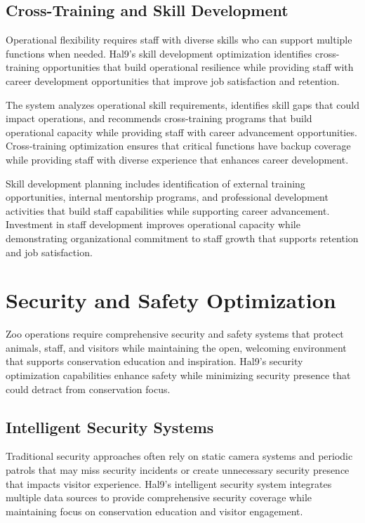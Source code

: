 \documentclass[
  Letterpaper,
]{scrbook}
\begin{document}
\subsection{Cross-Training and Skill
Development}\label{cross-training-and-skill-development}

Operational flexibility requires staff with diverse skills who can
support multiple functions when needed. Hal9's skill development
optimization identifies cross-training opportunities that build
operational resilience while providing staff with career development
opportunities that improve job satisfaction and retention.

The system analyzes operational skill requirements, identifies skill
gaps that could impact operations, and recommends cross-training
programs that build operational capacity while providing staff with
career advancement opportunities. Cross-training optimization ensures
that critical functions have backup coverage while providing staff with
diverse experience that enhances career development.

Skill development planning includes identification of external training
opportunities, internal mentorship programs, and professional
development activities that build staff capabilities while supporting
career advancement. Investment in staff development improves operational
capacity while demonstrating organizational commitment to staff growth
that supports retention and job satisfaction.

\section{Security and Safety
Optimization}\label{security-and-safety-optimization}

Zoo operations require comprehensive security and safety systems that
protect animals, staff, and visitors while maintaining the open,
welcoming environment that supports conservation education and
inspiration. Hal9's security optimization capabilities enhance safety
while minimizing security presence that could detract from conservation
focus.

\subsection{Intelligent Security
Systems}\label{intelligent-security-systems}

Traditional security approaches often rely on static camera systems and
periodic patrols that may miss security incidents or create unnecessary
security presence that impacts visitor experience. Hal9's intelligent
security system integrates multiple data sources to provide
comprehensive security coverage while maintaining focus on conservation
education and visitor engagement.
\end{document}
